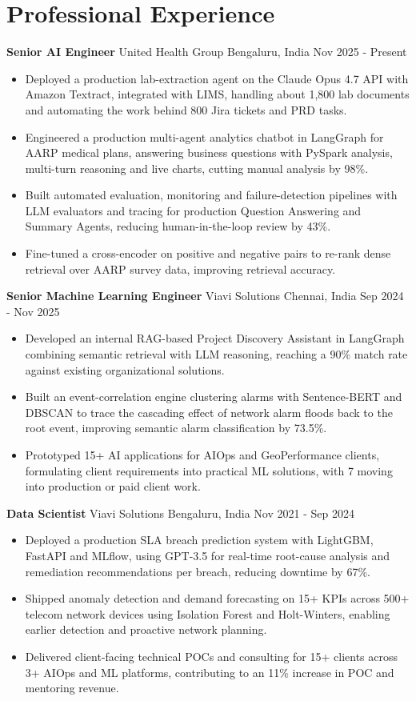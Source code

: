 \documentclass[10pt,a4paper]{article}
\newcommand{\role}[4]{\textbf{#1} \textbar{} #2 \hfill #3 \textbar{} #4\par}
\begin{document}
\section{Professional Experience}
\role{Senior AI Engineer}{United Health Group}{Bengaluru, India}{Nov 2025 - Present}
\begin{itemize}
  \item Deployed a production lab-extraction agent on the Claude Opus 4.7 API with Amazon Textract, integrated with LIMS, handling about 1,800 lab documents and automating the work behind 800 Jira tickets and PRD tasks.
  \item Engineered a production multi-agent analytics chatbot in LangGraph for AARP medical plans, answering business questions with PySpark analysis, multi-turn reasoning and live charts, cutting manual analysis by 98\%.
  \item Built automated evaluation, monitoring and failure-detection pipelines with LLM evaluators and tracing for production Question Answering and Summary Agents, reducing human-in-the-loop review by 43\%.
  \item Fine-tuned a cross-encoder on positive and negative pairs to re-rank dense retrieval over AARP survey data, improving retrieval accuracy.
\end{itemize}
\vspace{3pt}
\role{Senior Machine Learning Engineer}{Viavi Solutions}{Chennai, India}{Sep 2024 - Nov 2025}
\begin{itemize}
  \item Developed an internal RAG-based Project Discovery Assistant in LangGraph combining semantic retrieval with LLM reasoning, reaching a 90\% match rate against existing organizational solutions.
  \item Built an event-correlation engine clustering alarms with Sentence-BERT and DBSCAN to trace the cascading effect of network alarm floods back to the root event, improving semantic alarm classification by 73.5\%.
  \item Prototyped 15+ AI applications for AIOps and GeoPerformance clients, formulating client requirements into practical ML solutions, with 7 moving into production or paid client work.
\end{itemize}
\vspace{3pt}
\role{Data Scientist}{Viavi Solutions}{Bengaluru, India}{Nov 2021 - Sep 2024}
\begin{itemize}
  \item Deployed a production SLA breach prediction system with LightGBM, FastAPI and MLflow, using GPT-3.5 for real-time root-cause analysis and remediation recommendations per breach, reducing downtime by 67\%.
  \item Shipped anomaly detection and demand forecasting on 15+ KPIs across 500+ telecom network devices using Isolation Forest and Holt-Winters, enabling earlier detection and proactive network planning.
  \item Delivered client-facing technical POCs and consulting for 15+ clients across 3+ AIOps and ML platforms, contributing to an 11\% increase in POC and mentoring revenue.
\end{itemize}
\end{document}
